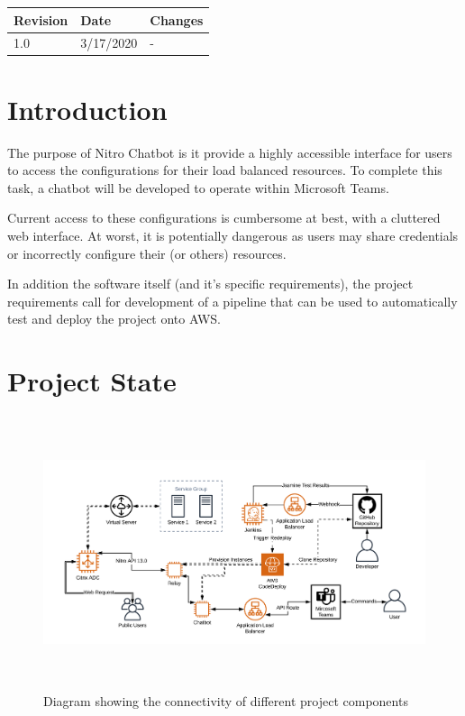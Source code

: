 \documentclass[onecolumn, draftclsnofoot,10pt, compsoc]{IEEEtran}
\begin{document}
\begin{tabular}{ p{1in} p{1in} p{4in} }
 \textbf{Revision} & \textbf{Date} & \textbf{Changes} \\
 \hline
 1.0 & 3/17/2020 
 & - \\

 \hline
\end{tabular}

\clearpage

\section{Introduction}
The purpose of Nitro Chatbot is it provide a highly accessible interface for users to access the configurations for their load balanced resources.
To complete this task, a chatbot will be developed to operate within Microsoft Teams.

Current access to these configurations is cumbersome at best, with a cluttered web interface.
At worst, it is potentially dangerous as users may share credentials or incorrectly configure their (or others) resources.

In addition the software itself (and it's specific requirements), the project requirements call for development of a pipeline that can be used to automatically test and deploy the project onto AWS.
\section{Project State}
\begin{figure}[h]
    \centering
    \captionsetup{format=hang,justification=raggedright,margin=2cm}
    \includegraphics[height=8cm]{projectdiagram.png}
    \caption[Project Diagram]{Diagram showing the connectivity of different project components}
    \label{fig:Project Diagram}
\end{figure}
\end{document}
